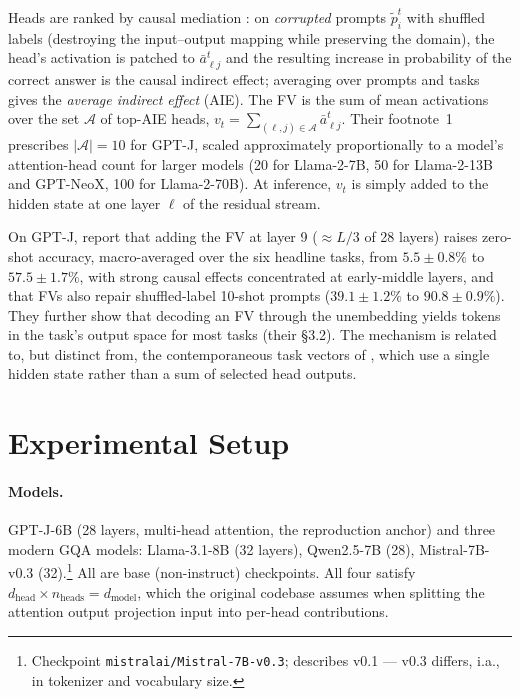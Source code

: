 \documentclass[11pt]{article}
\begin{document}
Heads are ranked by causal mediation
\citep{pearl2001direct,vig2020investigating}: on \emph{corrupted} prompts
$\tilde{p}^t_i$ with shuffled labels (destroying the input--output mapping
while preserving the domain), the head's activation is patched to
$\bar{a}^t_{\ell j}$ and the resulting increase in probability of the
correct answer is the causal indirect effect; averaging over prompts and
tasks gives the \emph{average indirect effect} (AIE). The FV is the sum of
mean activations over the set $\mathcal{A}$ of top-AIE heads,
$v_t = \sum_{(\ell,j)\in\mathcal{A}} \bar{a}^t_{\ell j}$. Their footnote~1
prescribes $|\mathcal{A}| = 10$ for GPT-J, scaled approximately
proportionally to a model's attention-head count for larger models (20 for
Llama-2-7B, 50 for Llama-2-13B and GPT-NeoX, 100 for Llama-2-70B). At
inference, $v_t$ is simply added to the hidden state at one layer $\ell$ of
the residual stream.

On GPT-J, \citet{todd2024function} report that adding the FV at layer 9
(${\approx}L/3$ of 28 layers) raises zero-shot accuracy, macro-averaged over
the six headline tasks, from $5.5 \pm 0.8\%$ to $57.5 \pm 1.7\%$, with
strong causal effects concentrated at early-middle layers, and that FVs
also repair shuffled-label 10-shot prompts ($39.1 \pm 1.2\%$ to
$90.8 \pm 0.9\%$). They further show that decoding an FV through the
unembedding yields tokens in the task's output space for most tasks
(their \S3.2). The mechanism is related to,
but distinct from, the contemporaneous task vectors of
\citet{hendel2023incontext}, which use a single hidden state rather than a
sum of selected head outputs.

\section{Experimental Setup}

\paragraph{Models.} GPT-J-6B (28 layers, multi-head attention, the
reproduction anchor) and three modern GQA models: Llama-3.1-8B (32 layers),
Qwen2.5-7B (28), Mistral-7B-v0.3 (32).\footnote{Checkpoint
\texttt{mistralai/Mistral-7B-v0.3}; \citet{jiang2023mistral} describes
v0.1 --- v0.3 differs, i.a., in tokenizer and vocabulary size.} All are
base (non-instruct) checkpoints. All four satisfy
$d_{\text{head}} \times n_{\text{heads}} = d_{\text{model}}$, which the
original codebase assumes when splitting the attention output projection
input into per-head contributions.
\end{document}
